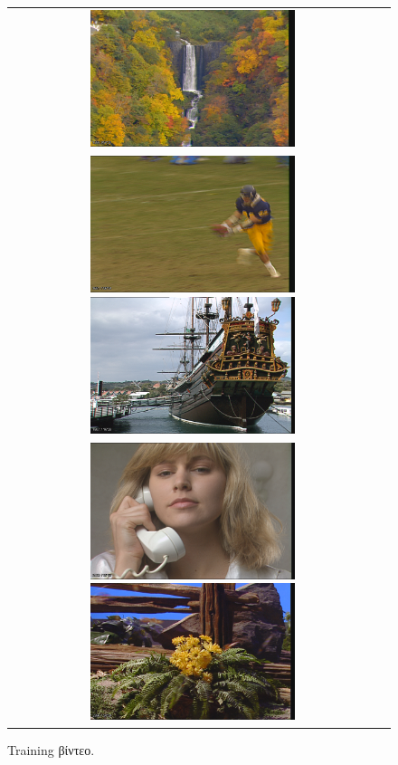 \begin{figure}[p]
\begin{tabular}{c c}
    \includegraphics[height=4.0cm]{chapter4/frames/src18.png}\\
    \includegraphics[height=4.0cm]{chapter4/frames/src19.png}
    \includegraphics[height=4.0cm]{chapter4/frames/src20.png}\\
    \includegraphics[height=4.0cm]{chapter4/frames/src21.png}
    \includegraphics[height=4.0cm]{chapter4/frames/src22.png}
\end{tabular}
\caption{Training βίντεο.}
\label{fig:trainingset}
\end{figure}

